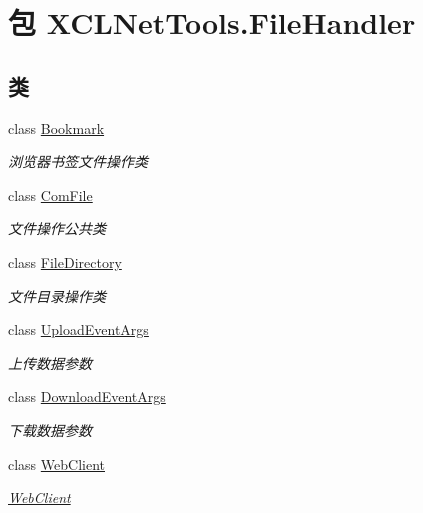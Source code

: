 \hypertarget{namespace_x_c_l_net_tools_1_1_file_handler}{\section{包 X\-C\-L\-Net\-Tools.\-File\-Handler}
\label{namespace_x_c_l_net_tools_1_1_file_handler}
}
\subsection*{类}
\begin{DoxyCompactItemize}
\item 
class \hyperlink{class_x_c_l_net_tools_1_1_file_handler_1_1_bookmark}{Bookmark}
\begin{DoxyCompactList}\small\item\em 浏览器书签文件操作类 \end{DoxyCompactList}\item 
class \hyperlink{class_x_c_l_net_tools_1_1_file_handler_1_1_com_file}{Com\-File}
\begin{DoxyCompactList}\small\item\em 文件操作公共类 \end{DoxyCompactList}\item 
class \hyperlink{class_x_c_l_net_tools_1_1_file_handler_1_1_file_directory}{File\-Directory}
\begin{DoxyCompactList}\small\item\em 文件目录操作类 \end{DoxyCompactList}\item 
class \hyperlink{class_x_c_l_net_tools_1_1_file_handler_1_1_upload_event_args}{Upload\-Event\-Args}
\begin{DoxyCompactList}\small\item\em 上传数据参数 \end{DoxyCompactList}\item 
class \hyperlink{class_x_c_l_net_tools_1_1_file_handler_1_1_download_event_args}{Download\-Event\-Args}
\begin{DoxyCompactList}\small\item\em 下载数据参数 \end{DoxyCompactList}\item 
class \hyperlink{class_x_c_l_net_tools_1_1_file_handler_1_1_web_client}{Web\-Client}
\begin{DoxyCompactList}\small\item\em \hyperlink{class_x_c_l_net_tools_1_1_file_handler_1_1_web_client}{Web\-Client} \end{DoxyCompactList}\item 

\end{DoxyCompactItemize}
